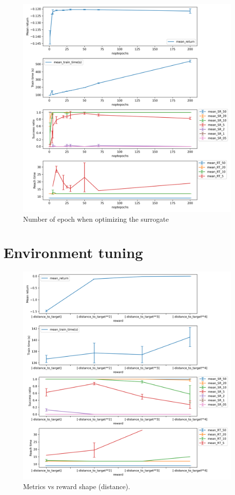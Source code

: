 \documentclass{article}
\begin{document}
\begin{figure}[H]
    \centering
    \includegraphics[width=\textwidth]{../ppo2_noptepochs.png}
\caption{Number of epoch when optimizing the surrogate}
\end{figure}






\section{Environment tuning}


\begin{figure}[H]
    \centering
    \includegraphics[width=\textwidth]{../reward_dist.png}
\caption{Metrics vs reward shape (distance).}
\end{figure}
\end{document}
